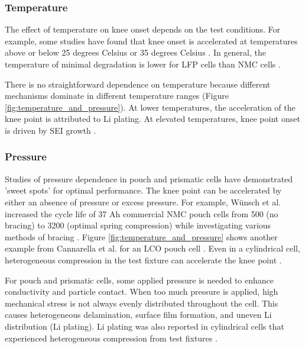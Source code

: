 \documentclass{article}
\begin{document}
\subsubsection{Temperature}
The effect of temperature on knee onset depends on the test conditions. For example, some studies have found that knee onset is accelerated at temperatures above or below 25 degrees Celsius \cite{zhang_accelerated_2019, waldmann_temperature_2014, waldmann_optimization_2015} or 35 degrees Celsius \cite{schuster_nonlinear_2015}. In general, the temperature of minimal degradation is lower for LFP cells than NMC cells \cite{preger_degradation_2020}. 

There is no straightforward dependence on temperature because different mechanisms dominate in different temperature ranges (Figure \ref{fig:temperature_and_pressure}). At lower temperatures, the acceleration of the knee point is attributed to Li plating. At elevated temperatures, knee point onset is driven by SEI growth \cite {zhang_accelerated_2019,schuster_nonlinear_2015,waldmann_temperature_2014,waldmann_optimization_2015}.

\subsubsection{Pressure}
Studies of pressure dependence in pouch and prismatic cells have demonstrated 'sweet spots' for optimal performance. The knee point can be accelerated by either an absence of pressure or excess pressure. For example, Wünsch et al. increased the cycle life of 37 Ah commercial NMC pouch cells from 500 (no bracing) to 3200 (optimal spring compression) while investigating various methods of bracing \cite{wunsch_investigation_2019}. Figure \ref{fig:temperature_and_pressure} shows another example from Cannarella et al. for an LCO pouch cell \cite{cannarella_stress_2014}. Even in a cylindrical cell, heterogeneous compression in the test fixture can accelerate the knee point \cite{bach_nonlinear_2016}. 

For pouch and prismatic cells, some applied pressure is needed to enhance conductivity and particle contact. When too much pressure is applied, high mechanical stress is not always evenly distributed throughout the cell. This causes heterogeneous delamination, surface film formation, and uneven Li distribution (Li plating). Li plating was also reported in cylindrical cells that experienced heterogeneous compression from test fixtures \cite{bach_nonlinear_2016}. 
\end{document}
